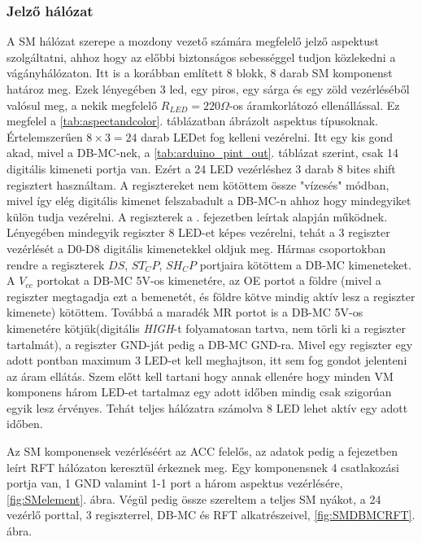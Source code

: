 \documentclass[a4paper,12pt]{article}
\begin{document}
\subsubsection{Jelző hálózat}
A SM hálózat szerepe a mozdony vezető számára megfelelő jelző aspektust szolgáltatni, ahhoz hogy az előbbi biztonságos sebességgel tudjon közlekedni a vágányhálózaton.
Itt is a korábban említett 8 blokk, 8 darab SM komponenst határoz meg.
Ezek lényegében 3 led, egy piros, egy sárga és egy zöld vezérléséből valósul meg, a nekik megfelelő $R_{LED} = 220\Omega$-os áramkorlátozó ellenállással.
Ez megfelel a \ref{tab:aspectandcolor}. táblázatban ábrázolt aspektus típusoknak.
Értelemszerűen $8\times 3 = 24$ darab LEDet fog kelleni vezérelni.
Itt egy kis gond akad, mivel a DB-MC-nek, a \ref{tab:arduino_pint_out}. táblázat szerint, csak 14 digitális kimeneti portja van.
Ezért a 24 LED vezérléshez 3 darab 8 bites shift regisztert használtam.
A regisztereket nem kötöttem össze "vízesés" módban, mivel így elég digitális kimenet felszabadult a DB-MC-n ahhoz hogy mindegyiket külön tudja vezérelni.
A regiszterek a \textit{}. fejezetben leírtak alapján működnek.
Lényegében mindegyik regiszter 8 LED-et képes vezérelni, tehát a 3 regiszter vezérlését a D0-D8 digitális kimenetekkel oldjuk meg.
Hármas csoportokban rendre a regiszterek $DS$, $ST_CP$, $SH_CP$ portjaira kötöttem a DB-MC kimeneteket.
A  $V_{cc}$ portokat a DB-MC 5V-os kimenetére, az OE portot a földre (mivel a regiszter megtagadja ezt a bemenetét, és földre kötve mindig aktív lesz a regiszter kimenete) kötöttem.
Továbbá a maradék MR portot is a  DB-MC 5V-os kimenetére kötjük(digitális \textit{HIGH}-t folyamatosan tartva, nem törli ki a regiszter tartalmát), a regiszter GND-ját pedig a DB-MC GND-ra.
Mivel egy regiszter egy adott pontban maximum 3 LED-et kell meghajtson, itt sem fog gondot jelenteni az áram ellátás.
Szem előtt kell tartani hogy annak ellenére hogy minden VM komponens három LED-et tartalmaz egy adott időben mindig csak szigorúan egyik lesz érvényes.
Tehát teljes hálózatra számolva 8 LED lehet aktív egy adott időben.

Az SM komponensek vezérléséért az ACC felelős, az adatok pedig a \textit{} fejezetben leírt RFT hálózaton keresztül érkeznek meg.
Egy komponensnek 4 csatlakozási portja van, 1 GND valamint 1-1 port a három aspektus vezérlésére, \ref{fig:SMelement}. ábra.
Végül pedig össze szereltem a teljes SM nyákot, a 24 vezérlő porttal, 3 regiszterrel, DB-MC és RFT alkatrészeivel, \ref{fig:SMDBMCRFT}. ábra.
\end{document}
